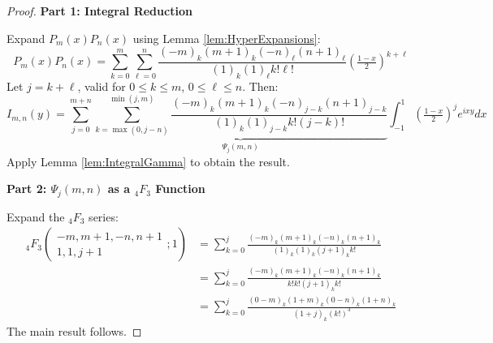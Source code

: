\documentclass{article}
\begin{document}
\begin{proof}
  \textbf{Part 1: Integral Reduction}

  Expand $P_m (x) P_n (x)$ using Lemma \ref{lem:HyperExpansions}:
  \begin{equation*}
    P_m (x) P_n (x) = \sum_{k = 0}^m \sum_{\ell = 0}^n \frac{(- m)_k (m +
    1)_k (- n)_{\ell} (n + 1)_{\ell}}{(1)_k (1)_{\ell} k! \ell !} \left(
    \tfrac{1 - x}{2} \right)^{k + \ell}
  \end{equation*}
  Let $j = k + \ell$, valid for $0 \leq k \leq m$, $0 \leq \ell \leq n$. Then:
  \begin{equation*}
    I_{m, n} (y) = \sum_{j = 0}^{m + n} \underbrace{\sum_{k = \max (0, j -
    n)}^{\min (j, m)} \frac{(- m)_k (m + 1)_k (- n)_{j - k} (n + 1)_{j -
    k}}{(1)_k (1)_{j - k} k! (j - k) !}}_{\Psi_j (m, n)} \int_{- 1}^1 \left(
    \tfrac{1 - x}{2} \right)^j e^{ixy} dx
  \end{equation*}
  Apply Lemma \ref{lem:IntegralGamma} to obtain the result.

  \textbf{Part 2: $\Psi_j (m, n)$ as a $_4 F_3$ Function}

  Expand the $_4 F_3$ series:
  \begin{equation*}
    \begin{aligned}
      {}_4 F_3 \left( \begin{array}{c}
        - m, m + 1, - n, n + 1 \\
        1, 1, j + 1
      \end{array} ; 1 \right) & = \sum_{k = 0}^j \frac{(- m)_k (m + 1)_k (-
      n)_k (n + 1)_k}{(1)_k (1)_k (j + 1)_k k!} \\
      & = \sum_{k = 0}^j \frac{(- m)_k (m + 1)_k (- n)_k (n + 1)_k}{k! k!
      (j + 1)_k k!} \\
      & = \sum_{k = 0}^j \frac{(0 - m)_k (1 + m)_k (0 - n)_k (1 + n)_k}{(1
      + j)_k (k!)^3 }
    \end{aligned}
  \end{equation*}
  The main result follows.
\end{proof}
\end{document}
